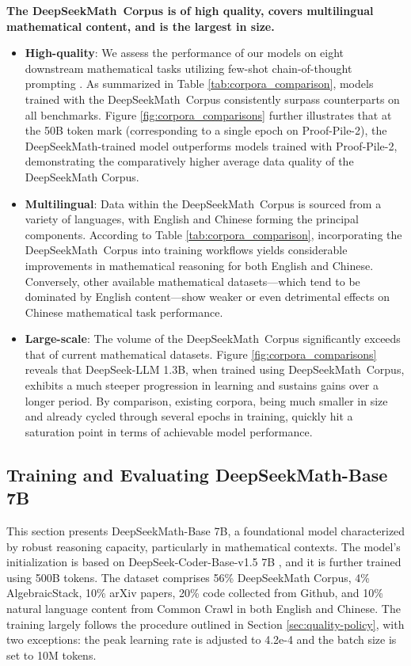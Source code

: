\begin{itemize}[topsep=0pt]
\textbf{The DeepSeekMath~Corpus is of high quality, covers multilingual mathematical content, and is the largest in size.}

\begin{itemize}[topsep=0pt]
    \item \textbf{High-quality}:
    We assess the performance of our models on eight downstream mathematical tasks utilizing few-shot chain-of-thought prompting \cite{cot}. As summarized in Table \ref{tab:corpora_comparison}, models trained with the DeepSeekMath~Corpus consistently surpass counterparts on all benchmarks. Figure \ref{fig:corpora_comparisons} further illustrates that at the 50B token mark (corresponding to a single epoch on Proof-Pile-2), the DeepSeekMath-trained model outperforms models trained with Proof-Pile-2, demonstrating the comparatively higher average data quality of the DeepSeekMath Corpus.
    \item \textbf{Multilingual}:
    Data within the DeepSeekMath~Corpus is sourced from a variety of languages, with English and Chinese forming the principal components. According to Table \ref{tab:corpora_comparison}, incorporating the DeepSeekMath~Corpus into training workflows yields considerable improvements in mathematical reasoning for both English and Chinese. Conversely, other available mathematical datasets—which tend to be dominated by English content—show weaker or even detrimental effects on Chinese mathematical task performance.
    \item \textbf{Large-scale}:
    The volume of the DeepSeekMath~Corpus significantly exceeds that of current mathematical datasets. Figure \ref{fig:corpora_comparisons} reveals that DeepSeek-LLM 1.3B, when trained using DeepSeekMath~Corpus, exhibits a much steeper progression in learning and sustains gains over a longer period. By comparison, existing corpora, being much smaller in size and already cycled through several epochs in training, quickly hit a saturation point in terms of achievable model performance.
\end{itemize}

\subsection{Training and Evaluating DeepSeekMath-Base 7B}

This section presents DeepSeekMath-Base 7B, a foundational model characterized by robust reasoning capacity, particularly in mathematical contexts. The model's initialization is based on DeepSeek-Coder-Base-v1.5 7B \citep{deepseek-coder}, and it is further trained using 500B tokens. The dataset comprises 56\% DeepSeekMath Corpus, 4\% AlgebraicStack, 10\% arXiv papers, 20\% code collected from Github, and 10\% natural language content from Common Crawl in both English and Chinese. The training largely follows the procedure outlined in Section \ref{sec:quality-policy}, with two exceptions: the peak learning rate is adjusted to 4.2e-4 and the batch size is set to 10M tokens.


\end{itemize}
